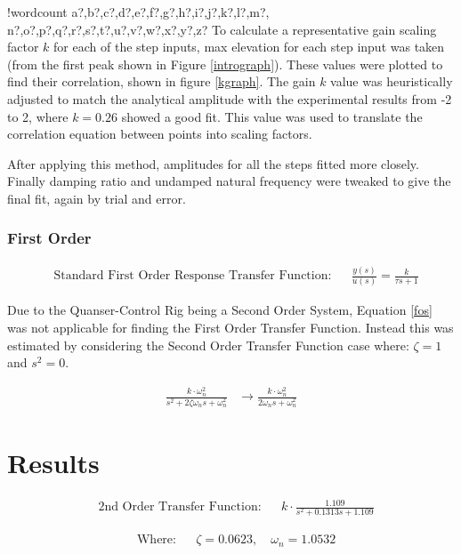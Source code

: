 \documentclass[11pt]{article}
\newcounter{words}
\newenvironment{counted}{%
  \setcounter{words}{0}
  \SearchList!{wordcount}{\stepcounter{words}}
    {a?,b?,c?,d?,e?,f?,g?,h?,i?,j?,k?,l?,m?,
    n?,o?,p?,q?,r?,s?,t?,u?,v?,w?,x?,y?,z?}
  \UndoBoundary{'}
  \SearchOrder{p;}}{%
  \StopSearching}
\begin{document}
\begin{counted}
To calculate a representative gain scaling factor \(k\) for each of the
step inputs, max elevation for each step input was taken (from the first
peak shown in Figure \ref{intrograph}). These values were plotted to
find their correlation, shown in figure \ref{kgraph}. The gain \(k\)
value was heuristically adjusted to match the analytical amplitude with
the experimental results from -2 to 2, where \(k = 0.26\) showed a good
fit. This value was used to translate the correlation equation between
points into scaling factors.

After applying this method, amplitudes for all the steps fitted more
closely. Finally damping ratio and undamped natural frequency were
tweaked to give the final fit, again by trial and error.

\subsubsection{First Order}\label{first-order}

\begin{align}
 &\text{Standard First Order Response Transfer Function:} &&\frac { y(s) }{ u(s) } =\frac { k }{ \tau s+1 }
\label{fos}
\end{align}

Due to the Quanser-Control Rig being a Second Order System, Equation
\ref{fos} was not applicable for finding the First Order Transfer
Function. Instead this was estimated by considering the Second Order
Transfer Function case where: \(\zeta =1\) and \(s^2=0\).

\begin{align}
\frac { k\cdot \omega_{ n }^{ 2 } }{ s^2 + 2\zeta \omega_{ n }s+\omega_{ n }^{ 2 } } &\rightarrow \frac { k\cdot \omega_{ n }^{ 2 } }{ 2\omega_{ n }s+\omega_{ n }^{ 2 } }
\end{align}

\section{Results}\label{results}

\begin{align}
&\text{2nd Order Transfer Function}: && k \cdot \frac { 1.109 }{ s^{ 2 }+0.1313s+1.109 }
\end{align}

\begin{align*}
&\text{Where:} &&\zeta = 0.0623, \quad \omega_n = 1.0532
\end{align*}


\end{counted}
\end{document}
